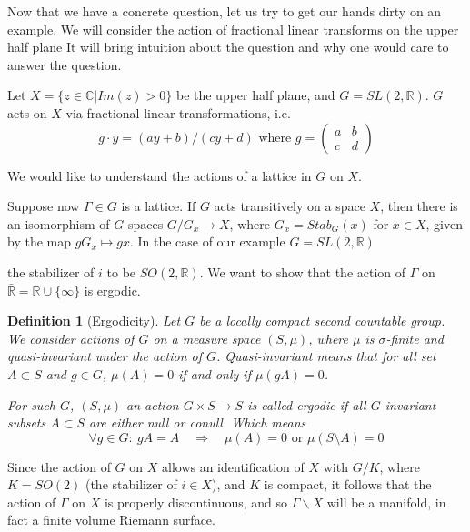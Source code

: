 \documentclass[
  12pt
]{article}
\newtheorem{defn}{Definition}[thm]
\theoremstyle{plain}
\newcommand{\G}{\ensuremath{G}\xspace}
\newcommand{\bbr}{\ensuremath{\mathbb{R}}\xspace}
\newcommand{\bbc}{\ensuremath{\mathbb{C}}\xspace}
\newcommand{\sltr}{\ensuremath{SL(2, \mathbb{R})}\xspace}
\begin{document}
  Now that we have a concrete question, let us try to get our hands dirty
  on an example. We will consider the action of fractional linear transforms on
  the upper half plane
  It will bring intuition about the question and why one would care to
  answer the question.

  Let $X = \{z \in \bbc  | Im(z) >0\}$ be the upper half plane, and $G = \sltr$.
  \G acts on $X$ via fractional linear transformations, i.e.
  $$
  g \cdot y = (ay + b)/(cy +d) \text{ where } g= \begin{pmatrix}
    a & b \\
    c & d 
  \end{pmatrix}
  $$

  We would like to understand the actions of a lattice in \G on $X$.

  Suppose now $\Gamma \in G$ is a lattice. 
  If $G$ acts transitively on a space $X$, then there is an isomorphism
  of $G$-spaces $G/G_x \rightarrow X$, where $G_x = Stab_G (x)$ for
  $x \in X$, given by the map $gG_x \mapsto gx$. In the case of our
  example $G = SL(2, \mathbb{R})$

  the stabilizer of $i$ to be $SO(2,\mathbb{R})$.
  We want to show that the action of $\Gamma$ on
  $\bar{\mathbb{R}} = \bbr \cup \{\infty\}$ is ergodic.

  \begin{defn}[Ergodicity]
    Let \G be a locally compact second countable group.
    We consider actions of \G on a measure space $(S, \mu)$, where $\mu$ is
    $\sigma$-finite and quasi-invariant under the action of \G.
    \emph{Quasi-invariant} means that for all set $A \subset S$ and $g \in G$,
    $\mu(A) = 0$ if and only if $\mu(gA) = 0$.

    For such \G, $(S, \mu)$ an action $G \times S \rightarrow S$ is called
    ergodic if all $G$-invariant subsets $A\subset S$ are either null or
    conull.
    Which means 
    $$
    \forall g\in G:\ gA = A \quad \Rightarrow \quad \mu(A)=0 \text{ or } \mu(S\setminus A)=0
    $$
  \end{defn}


  Since the action of $G$ on $X$
  allows an identification of $X$ with $G/K$, where $K = SO(2)$ (the
  stabilizer of $i \in X$), and $K$ is compact, it follows that the
  action of $\Gamma$ on $X$ is properly discontinuous, and so
  $\Gamma\backslash X$ will be a manifold, in fact a finite volume
  Riemann surface.
\end{document}
